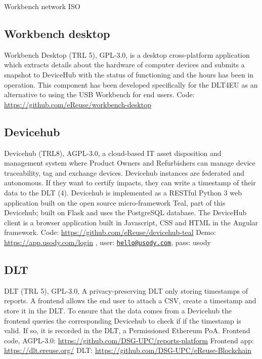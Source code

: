 \documentclass[
]{book}
\begin{document}
Workbench network ISO

\hypertarget{workbench-desktop}{%
\subsection{Workbench desktop}\label{workbench-desktop}}

Workbench Desktop (TRL 5), GPL-3.0, is a desktop cross-platform application which extracts details about the hardware of computer devices and submits a snapshot to DeviceHub with the status of functioning and the hours has been in operation. This component has been developed specifically for the DLT4EU as an alternative to using the USB Workbench for end users.
Code: \url{https://github.com/eReuse/workbench-desktop}

\hypertarget{devicehub}{%
\subsection{Devicehub}\label{devicehub}}

Devicehub (TRL8), AGPL-3.0, a cloud-based IT asset disposition and management system where Product Owners and Refurbishers can manage device traceability, tag and exchange devices. Devicehub instances are federated and autonomous. If they want to certify impacts, they can write a timestamp of their data to the DLT (4). Devicehub is implemented as a RESTful Python 3 web application built on the open source micro-framework Teal, part of this Devicehub; built on Flask and uses the PostgreSQL database. The DeviceHub client is a browser application built in Javascript, CSS and HTML in the Angular framework.
Code: \url{https://github.com/eReuse/devicehub-teal}
Demo: \url{https://app.usody.com/login} , user: \href{mailto:hello@usody.com}{\nolinkurl{hello@usody.com}}, pass: usody

\hypertarget{dlt}{%
\subsection{DLT}\label{dlt}}

DLT (TRL 5), GPL-3.0, A privacy-preserving DLT only storing timestamps of reports. A frontend allows the end user to attach a CSV, create a timestamp and store it in the DLT. To ensure that the data comes from a Devicehub the frontend queries the corresponding Devicehub to check if if the timestamp is valid. If so, it is recorded in the DLT, a Permissioned Ethereum PoA.
Frontend code, AGPL-3.0: \url{https://github.com/DSG-UPC/reports-platform}
Frontend app: \url{https://dlt.ereuse.org/}
DLT: \url{https://github.com/DSG-UPC/eReuse-Blockchain}
\end{document}
